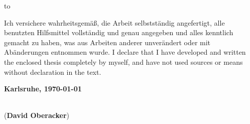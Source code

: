 \vspace*{36\baselineskip}
\hbox to \textwidth{\hrulefill}
\par
{}
  {Ich versichere wahrheitsgem\"a\ss, die Arbeit selbstst\"andig angefertigt, alle benutzten Hilfsmittel vollst\"andig und genau angegeben und alles kenntlich gemacht zu haben, was aus Arbeiten anderer unver\"andert oder mit Ab\"anderungen entnommen wurde.}
  {I declare that I have developed and written the enclosed thesis completely by myself, and have not used sources or means without declaration in the text.}

\textbf{Karlsruhe, \today}
\vspace{1.5cm}

\dotfill\hspace*{8.0cm}\\
\hspace*{2cm}(\textbf{David Oberacker}) %

\thispagestyle{empty}
